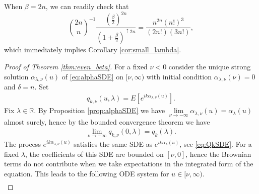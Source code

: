 \documentclass[12pt]{article}
\theoremstyle{definition} %
\newcommand{\R}{{\mathbb R}}
\theoremstyle{remark} %
\begin{document}
When $\beta=2n$, we can readily check that 
\[
 \binom{2n}{n}^{-1}\frac{\left(\tfrac{\beta}{2}\right)^{2n}}{\left(1+\frac{\beta}{2}\right)^{\uparrow 2n}} =\frac{n^{2n} (n!)^3 }{(2n!)(3n!) },
\]
which immediately implies Corollary \ref{cor:small_lambda}. 












\begin{proof}[Proof of Theorem \ref{thm:even_beta}]
For a fixed $\nu<0$ consider the unique strong solution $\alpha_{\lambda,\nu}(u)$ of \eqref{eq:alphaSDE} on $[\nu,\infty)$ with initial condition $\alpha_{\lambda,\nu}(\nu)=0$ and $\delta=n$. Set 
\begin{align}
    q_{k,\nu}(u,\lambda)=E[e^{i k \alpha_{\lambda,\nu}(u)}].
\end{align}
Fix $\lambda\in \R$. By Proposition \ref{prop:alphaSDE} we have  $\lim\limits_{\nu\to -\infty} \alpha_{\lambda,\nu}(u)=\alpha_\lambda(u)$ almost surely, hence by the bounded convergence theorem we have 
\begin{align}
    \lim_{\nu\to -\infty}  q_{k,\nu}(0,\lambda)=q_k(\lambda). 
\end{align}
The process $e^{i k \alpha_{\lambda,\nu}(u)}$ satisfies the same SDE as $e^{i k \alpha_\lambda(u)}$, see \eqref{eq:QkSDE}. For a fixed $\lambda$, the coefficients of this SDE are bounded on $[\nu,0]$, hence the Brownian terms do not contribute when we take expectations in the integrated form of the equation. 
This leads to the following ODE system for $u\in [\nu,\infty)$.
\begin{align}\label{eq:ODEq1}

\end{align}
\end{proof}
\end{document}
